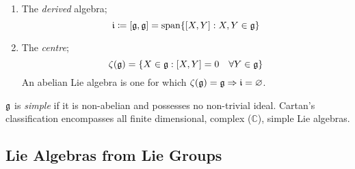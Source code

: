 \begin{enumerate}
\item The \emph{derived} algebra;
\begin{equation}
\mathfrak{i} \coloneqq [\alge, \alge] = \vecspan\set{[X, Y] : X, Y \in \alge}
\end{equation}
\item The \emph{centre};
\begin{equation}
\zeta(\alge) = \set{X \in \alge : [X, Y] = 0 \quad \forall Y \in \alge}
\end{equation}
An abelian Lie algebra is one for which $\zeta(\mathfrak{g}) = \mathfrak{g} \Rightarrow \mathfrak{i} = \varnothing$.
\end{enumerate}
\begin{definitionbox}
$\mathfrak{g}$ is \emph{simple} if it is non-abelian and possesses no non-trivial ideal. Cartan's classification encompasses all finite dimensional, complex ($\mathbb{C}$), simple Lie algebras.
\end{definitionbox}
\subsection{Lie Algebras from Lie Groups}
